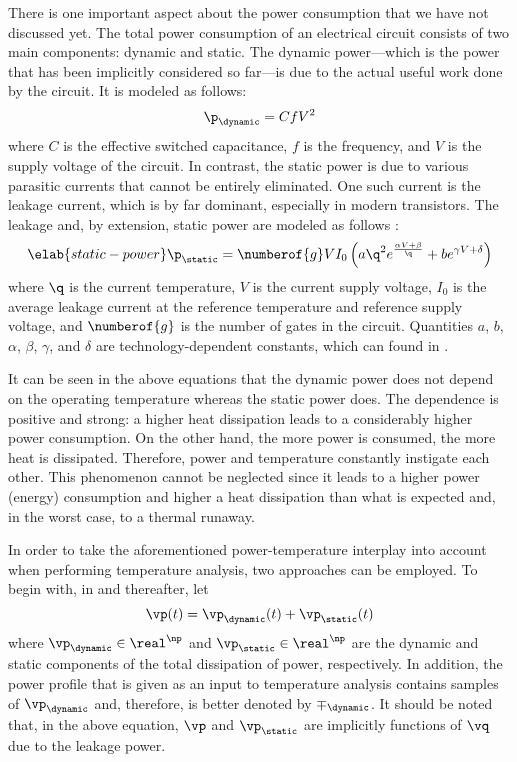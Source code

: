 There is one important aspect about the power consumption that we have not
discussed yet. The total power consumption of an electrical circuit consists of
two main components: dynamic and static. The dynamic power---which is the power
that has been implicitly considered so far---is due to the actual useful work
done by the circuit. It is modeled as follows:
\[
  \p_\dynamic = C f V^2
\]
where $C$ is the effective switched capacitance, $f$ is the frequency, and $V$
is the supply voltage of the circuit. In contrast, the static power is due to
various parasitic currents that cannot be entirely eliminated. One such current
is the leakage current, which is by far dominant, especially in modern 
transistors. The leakage and, by extension, static power are modeled as follows
\cite{liao2005}:
\begin{equation} \elab{static-power}
  \p_\static = \numberof{g} V I_0 \left(a \q^2 e^{\frac{\alpha V + \beta}{\q}} + b e^{\gamma V + \delta}\right)
\end{equation}
where $\q$ is the current temperature, $V$ is the current supply voltage, $I_0$
is the average leakage current at the reference temperature and reference supply
voltage, and $\numberof{g}$ is the number of gates in the circuit. Quantities
$a$, $b$, $\alpha$, $\beta$, $\gamma$, and $\delta$ are technology-dependent
constants, which can found in \cite{liao2005}.

It can be seen in the above equations that the dynamic power does not depend on
the operating temperature whereas the static power does. The dependence is
positive and strong: a higher heat dissipation leads to a considerably higher
power consumption. On the other hand, the more power is consumed, the more heat
is dissipated. Therefore, power and temperature constantly instigate each other.
This phenomenon cannot be neglected since it leads to a higher power (energy)
consumption and higher a heat dissipation than what is expected and, in the
worst case, to a thermal runaway.

In order to take the aforementioned power-temperature interplay into account
when performing temperature analysis, two approaches can be employed. To begin
with, in  and thereafter, let
\[
  \vp(t) = \vp_\dynamic(t) + \vp_\static(t)
\]
where $\vp_\dynamic \in \real^\np$ and $\vp_\static \in \real^\np$ are the
dynamic and static components of the total dissipation of power, respectively.
In addition, the power profile that is given as an input to temperature analysis
contains samples of $\vp_\dynamic$ and, therefore, is better denoted by
$\mp_\dynamic$. It should be noted that, in the above equation, $\vp$ and
$\vp_\static$ are implicitly functions of $\vq$ due to the leakage power.

